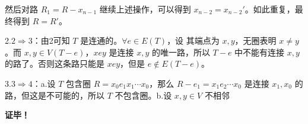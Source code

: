 然后对路 $R_1=R-x_{n-1}$ 继续上述操作，可以得到 $x_{n-2}=x_{n-2}'$。如此重复，最终得到 $R=R'$。

2.$2\Rightarrow 3$：由2可知 $T$ 是连通的。$\forall e\in E(T)$，设 其端点为 $x,y$，无圈表明 $x\neq y$。而 $x,y\in V(T-e)$，$xey$ 是连接 $x,y$ 的唯一路，所以 $T-e$ 中不能有连接 $x,y$ 的路了。否则这条路只能是 $xey$，但是 $e\not\in E(T-e)$。

3.$3\Rightarrow 4$：a.设 $T$ 包含圈 $R=x_0e_1x_1\cdots x_0$，那么 $R-e_1=x_1e_2\cdots x_0$ 是连接 $x_1,x_0$ 的路，但这是不可能的，所以 $T$ 不包含圈。b.设 $x,y\in V$ 不相邻



\textbf{证毕！}






















